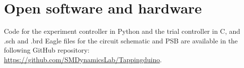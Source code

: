 \documentclass[twocolumn]{article}
\begin{document}
\section{Open software and hardware}

Code for the experiment controller in Python and the trial controller in C, and .sch and .brd Eagle files for the circuit schematic and PSB are available in the following GitHub repository: \url{https://github.com/SMDynamicsLab/Tappingduino}.


\printbibliography
\end{document}
